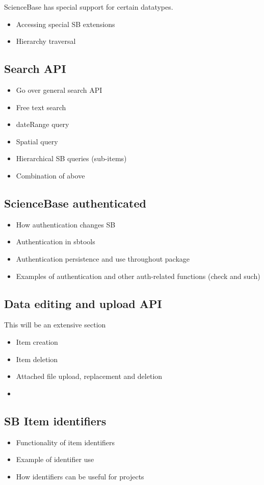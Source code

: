 ScienceBase has special support for certain datatypes. 


\begin{itemize}
	\item{Accessing special SB extensions}
	\item{Hierarchy traversal}
\end{itemize}


\subsection{Search API}
\begin{itemize}
	\item{Go over general search API}
	\item{Free text search}
	\item{dateRange query}
	\item{Spatial query}
	\item{Hierarchical SB queries (sub-items)}
	\item{Combination of above}
\end{itemize}

\subsection{ScienceBase authenticated}

\begin{itemize}
	\item{How authentication changes SB}
	\item{Authentication in sbtools}
	\item{Authentication persistence and use throughout package}
	\item{Examples of authentication and other auth-related functions (check and such)}
\end{itemize}


\subsection{Data editing and upload API}
This will be an extensive section
\begin{itemize}
	\item{Item creation}
	\item{Item deletion}
	\item{Attached file upload, replacement and deletion}
	\item{}
\end{itemize}

\subsection{SB Item identifiers}
\begin{itemize}
	\item{Functionality of item identifiers}
	\item{Example of identifier use}
	\item{How identifiers can be useful for projects}
\end{itemize}
